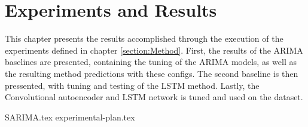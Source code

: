 \chapter{Experiments and Results}
\label{section:Results}

This chapter presents the results accomplished through the execution of the experiments defined in chapter \cref{section:Method}.
First, the results of the ARIMA baselines are presented, containing the tuning of the ARIMA models, as well as the resulting method predictions with these configs.
The second baseline is then pressented, with tuning and testing of the LSTM method.
Lastly, the Convolutional autoencoder and LSTM network is tuned and used on the dataset.


{SARIMA.tex}
{experimental-plan.tex}



\iffalse

  \section{Experimental Setup}
  \label{sec:experimentalSetup}

  The experimental setup should include all data - parameters etc, that would allow a person to repeat your experiments.

  \section{Experimental Results}
  \label{sec:experimentalResults}

  Results should be clearly displayed and should provide a suitable representation of your results for the points you wish to make. Graphs should be labeled in a legible font and if more than one result is displayed on the same graph then these should be clearly marked.   Please choose carefully rather than presenting every results. Too much information is hard to read and often hides the key information you wish to present. Make use of statistical methods when presenting results, where possible to strengthen the results.  Further, the format of the presentation of results should be chosen based on what issues in the results you wish to highlight. You may wish to present a subset in the experimental section and provide additional results in the appendix.
\fi
